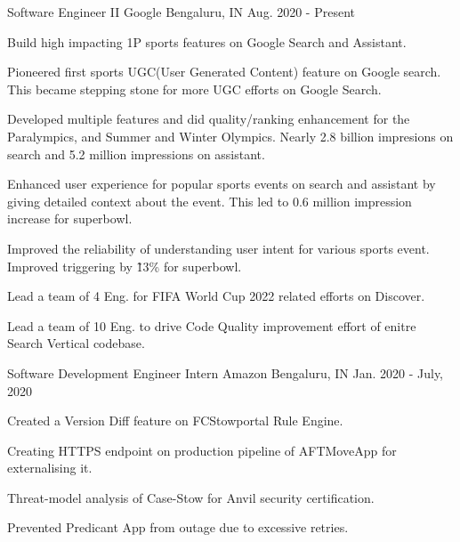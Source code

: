 


\begin{cventries}


\cventry
{Software Engineer II} %
{Google} %
{Bengaluru, IN} %
{Aug. 2020 - Present} %
{ %
\begin{cvitems}
\item {Build high impacting 1P sports features on Google Search and Assistant.}
\item {Pioneered first sports UGC(User Generated Content) feature on Google search. This became stepping stone for more UGC efforts on Google Search.}
\item {Developed multiple features and did quality/ranking enhancement for the Paralympics, and Summer and Winter Olympics. Nearly 2.8 billion impresions on search and 5.2 million impressions on assistant.}
\item {Enhanced user experience for popular sports events on search and assistant by giving detailed context about the event. This led to 0.6 million impression increase for superbowl.}
\item {Improved the reliability of understanding user intent for various sports event. Improved triggering by \~13\% for superbowl.}
\item {Lead a team of 4 Eng. for FIFA World Cup 2022 related efforts on Discover.}
\item {Lead a team of 10 Eng. to drive Code Quality improvement effort of enitre Search Vertical codebase.}
\end{cvitems}
}


\cventry
{Software Development Engineer Intern} %
{Amazon} %
{Bengaluru, IN} %
{Jan. 2020 - July, 2020} %
{ %
\begin{cvitems}
\item {Created a Version Diff feature on FCStowportal Rule Engine.}
\item {Creating HTTPS endpoint on production pipeline of AFTMoveApp for externalising it.}
\item {Threat-model analysis of Case-Stow for Anvil security certification.}
\item {Prevented Predicant App from outage due to excessive retries.}
\end{cvitems}
}


\end{cventries}